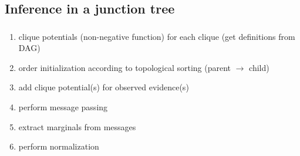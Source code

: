 \subsection{Inference in a junction tree}

\begin{frame}\frametitle{\subsecname}

\begin{enumerate}
\item clique potentials (non-negative function) for each clique (get definitions from DAG)
\item order initialization according to topological sorting (parent $\rightarrow$ child)
\item add clique potential(s) for observed evidence(s)
\item perform message passing
\item extract marginals from messages
\item perform normalization
\end{enumerate}



\end{frame}
